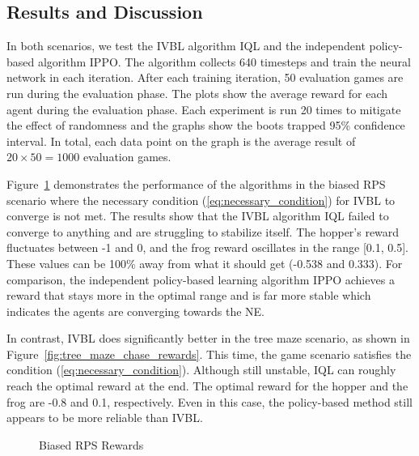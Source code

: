\documentclass[]{interact}
\theoremstyle{plain}%
\theoremstyle{definition}
\theoremstyle{remark}
\begin{document}
\subsection{Results and Discussion}
In both scenarios, we test the IVBL algorithm IQL and the independent policy-based algorithm IPPO. The algorithm collects 640 timesteps and train the neural network in each iteration. After each training iteration, 50 evaluation games are run during the evaluation phase. The plots show the average reward for each agent during the evaluation phase. Each experiment is run 20 times to mitigate the effect of randomness and the graphs show the boots trapped 95\% confidence interval. In total, each data point on the graph is the average result of $20 \times 50 = 1000$ evaluation games.

Figure~\ref{fig:biased_rps_in_food_chain_rewards} demonstrates the performance of the algorithms in the biased RPS scenario where the necessary condition (\ref{eq:necessary_condition}) for IVBL to converge is not met. The results show that the IVBL algorithm IQL failed to converge to anything and are struggling to stabilize itself. The hopper's reward fluctuates between -1 and 0, and the frog reward oscillates in the range [0.1, 0.5]. These values can be 100\% away from what it should get (-0.538 and 0.333). For comparison, the independent policy-based learning algorithm IPPO achieves a reward that stays more in the optimal range and is far more stable which indicates the agents are converging towards the NE.

In contrast, IVBL does significantly better in the tree maze scenario, as shown in Figure~\ref{fig:tree_maze_chase_rewards}. This time, the game scenario satisfies the condition (\ref{eq:necessary_condition}). Although still unstable, IQL can roughly reach the optimal reward at the end. The optimal reward for the hopper and the frog are -0.8 and 0.1, respectively. Even in this case, the policy-based method still appears to be more reliable than IVBL.

\begin{figure}
\centering
{}
\caption{Biased RPS Rewards}
\label{fig:biased_rps_in_food_chain_rewards}
\end{figure}
\end{document}
